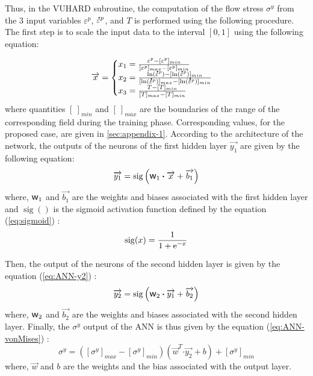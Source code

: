 \documentclass[preprint,12pt,times]{elsarticle}
\newcommand{\e}[1]{\mbox{\ensuremath{\mathrm{e}^{#1}}}}
\DeclareMathOperator{\sigmoid}{sig}
\newcommand{\dotp}{\boldsymbol{\cdot}}
\newcommand{\w}{\mbox{\large\ensuremath{\mathsf{w}}}}
\newcommand{\mdot}[1]{\accentset{\mbox{\bfseries .}}{#1}} %
\begin{document}
Thus, in the VUHARD subroutine, the computation of the flow stress $\sigma^y$ from the 3 input variables $\varepsilon^p$, $\mdot{\varepsilon}^p$, and $T$ is performed using the following procedure. The first step is to scale the input data to the interval $[0,1]$ using the following equation:

\begin{equation}
\overrightarrow{x} =
\begin{cases}
x_1 = \frac{\varepsilon^p - [\varepsilon^p]_{min}}{[\varepsilon^p]_{max} - [\varepsilon^p]_{min}}\\
x_2 = \frac{\ln(\mdot{\varepsilon}^p)-[\ln(\mdot{\varepsilon}^p)]_{min}}{[\ln(\mdot{\varepsilon}^p)]_{max}-[\ln(\mdot{\varepsilon}^p)]_{min}}\label{eq:ANN-preprocess}\\
x_3 = \frac{T-[T]_{min}}{[T]_{max}-[T]_{min}}
\end{cases}
\end{equation}
where quantities $[\ ]_{min}$ and $[\ ]_{max}$  are the boundaries of the range of the corresponding field during the training phase. Corresponding values, for the proposed case, are given in \ref{sec:appendix-1}.
According to the architecture of the network, the outputs of the neurons of the first hidden layer $\overrightarrow{y_1}$ are given by the following equation:
\begin{equation}
\overrightarrow{y_1} = \sigmoid\left(\w_1 \dotp \overrightarrow{x}+ \overrightarrow{b_1}\right)\label{eq:ANN-y1}
\end{equation}
where, $\w_1$ and $\overrightarrow{b_1}$ are the weights and biases associated with the first hidden layer and $\sigmoid()$ is the sigmoid activation function defined by the equation (\ref{eq:sigmoid}) :
\begin{equation}
\sigmoid(x)=\frac{1}{1 + \e{-x}}\label{eq:sigmoid}
\end{equation}

Then, the output of the neurons of the second hidden layer is given by the equation (\ref{eq:ANN-y2}) :
\begin{equation}
\overrightarrow{y_2} = \sigmoid\left(\w_2 \dotp \overrightarrow{y_1}+ \overrightarrow{b_2}\right)\label{eq:ANN-y2}
\end{equation}
where, $\w_2$ and $\overrightarrow{b_2}$ are the weights and biases associated with the second hidden layer.
Finally, the $\sigma^y$ output of the ANN is thus given by the equation (\ref{eq:ANN-vonMises}) :
\begin{equation}
\sigma^y =  \left([\sigma^y]_{max}-[\sigma^y]_{min}\right) \left(\overrightarrow{w}^T \dotp \overrightarrow{y_2} + b\right) + [\sigma^y]_{min} \label{eq:ANN-vonMises}
\end{equation}
where, $\overrightarrow{w}$ and $b$ are the weights and the bias associated with the output layer. 
\end{document}
